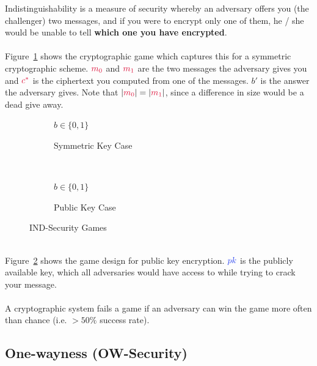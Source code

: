 Indistinguishability is a measure of security whereby an adversary offers you (the challenger) two messages, and if you were to encrypt only one of them, he / she would be unable to tell \textbf{which one you have encrypted}.\\
\\
Figure~\ref{fig:ind-sec-sym} shows the cryptographic game which captures this for a symmetric cryptographic scheme. $\csubm{0}$ and $\csubm{1}$ are the two messages the adversary gives you and $\ccast$ is the ciphertext you computed from one of the messages. $b'$ is the answer the adversary gives. Note that $|\csubm{0}|=|\csubm{1}|$, since a difference in size would be a dead give away.\\
\begin{figure}[htp!]
    \centering
    \begin{subfigure}[b]{0.4\textwidth}
        \centering
        \begin{cryptogame}{$b\in \{0,1\}$}
        \end{cryptogame}
        \caption{Symmetric Key  Case}
        \label{fig:ind-sec-sym}
    \end{subfigure}
    ~
    \begin{subfigure}[b]{0.4\textwidth}
        \centering
        \begin{cryptogame}{$b\in \{0,1\}$}
            \cgameright{$\cpk$}
        \end{cryptogame}
        \caption{Public Key Case}
        \label{fig:ind-sec-pub}
    \end{subfigure}
    \caption{IND-Security Games}
    \label{fig:ind-sec}
\end{figure}
\\
Figure~\ref{fig:ind-sec-pub} shows the game design for public key encryption. $\cpk$ is the publicly available key, which all adversaries would have access to while trying to crack your message.\\
\\
A cryptographic system fails a game if an adversary can win the game more often than chance (i.e. $> 50\%$ success rate).

\subsection{One-wayness (OW-Security)}

